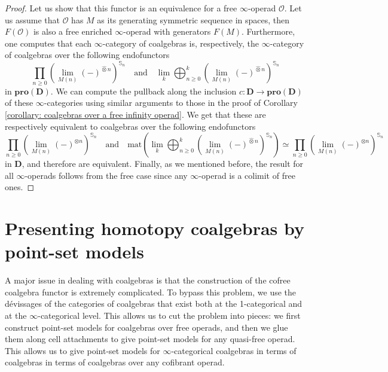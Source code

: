 \documentclass[a4paper,12pt]{amsart}
\theoremstyle{plain}
\theoremstyle{definition}
\theoremstyle{remark}
\begin{document}
\begin{proof}

Let us show that this functor is an equivalence for a free $\infty$-operad $\mathscr{O}$. Let us assume that $\mathscr{O}$ has $M$ as its generating symmetric sequence in spaces, then $F(\mathscr{O})$ is also a free enriched $\infty$-operad with generators $F(M)$. Furthermore, one computes that each $\infty$-category of coalgebras is, respectively, the $\infty$-category of coalgebras over the following endofunctors \[
\prod_{n \geq 0} \left(\lim_{M(n)} (-)^{\widehat{\otimes} n} \right)^{\mathbb{S}_n} \quad \text{and} \quad
\lim_k\bigoplus_{n \geq 0}^{k}  \left(\lim_{M(n)} (-)^{\widehat{\otimes} n}\right)^{\mathbb{S}_n}
\]in $\mathbf{pro}(\mathbf{D})$. We can compute the pullback along the inclusion $c: \mathbf{D} \longrightarrow \mathbf{pro}(\mathbf{D})$ of these $\infty$-categories using similar arguments to those in the proof of Corollary \ref{corollary: coalgebras over a free infinity operad}. We get that these are respectively equivalent to coalgebras over the following endofunctors 
\[
\prod_{n \geq 0} \left(\lim_{M(n)} (-)^{\otimes n} \right)^{\mathbb{S}_n} \quad \text{and} \quad
\mathrm{mat}\left(\lim_k\bigoplus_{n \geq 0}^{k}  \left(\lim_{M(n)} (-)^{\widehat{\otimes} n}\right)^{\mathbb{S}_n} \right) \simeq \prod_{n \geq 0} \left(\lim_{M(n)} (-)^{\otimes n} \right)^{\mathbb{S}_n}
\]in $\mathbf{D}$, and therefore are equivalent. Finally, as we mentioned before, the result for all $\infty$-operads follows from the free case since any $\infty$-operad is a colimit of free ones.
\end{proof}

\vspace{1pc}

\section{Presenting homotopy coalgebras by point-set models}

\vspace{2.5pc}

A major issue in dealing with coalgebras is that the construction of the cofree coalgebra functor is extremely complicated. To bypass this problem, we use the dévissages of the categories of coalgebras that exist both at the 1-categorical and at the $\infty$-categorical level. This allows us to cut the problem into pieces: we first construct point-set models for coalgebras over free operads, and then we glue them along cell attachments to give point-set models for any quasi-free operad. This allows us to give point-set models for $\infty$-categorical coalgebras in terms of coalgebras in terms of coalgebras over any cofibrant operad.
\end{document}
